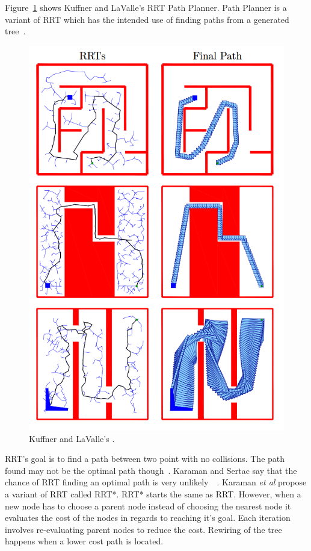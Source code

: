 \documentclass[journal]{IEEEtran}
\begin{document}
Figure~\ref{KuffnerRRT} shows  Kuffner and LaValle's RRT Path Planner. Path Planner is a variant of RRT which has the intended use of finding paths from a generated tree~\cite{Kuffner2000}.
\begin{figure}[h]
	\includegraphics[width=1.0\linewidth]{KuffnerRRT.png}
	\caption{ Kuffner and LaValle's \cite{Kuffner2000}.}
	\label{KuffnerRRT}
\end{figure} 

RRT's goal is to find a path between two point with no collisions. The path found may not be the optimal path though~\cite{Kuffner2000, Karaman2011}.  Karaman and Sertac say that the chance of RRT finding an optimal path is very unlikely~\cite{karaman2010}~\cite{Tremblay2014}.  Karaman \textit{et al} propose a variant of RRT called RRT*. RRT* starts the same as RRT. However, when a new node has to choose a parent node instead of choosing the  nearest node it evaluates the cost of the nodes in regards to reaching it's goal. Each iteration involves re-evaluating parent nodes to reduce the cost. Rewiring of the tree happens when a lower cost path is located.
\end{document}
